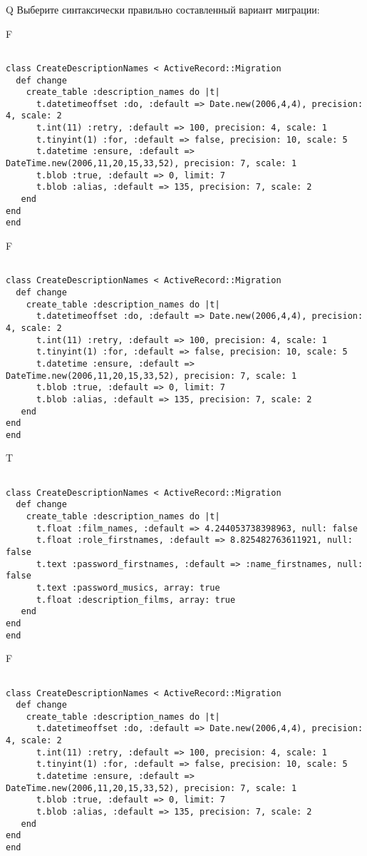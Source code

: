Q
Выберите синтаксически правильно составленный вариант миграции:

F
\begin{verbatim}
		
class CreateDescriptionNames < ActiveRecord::Migration 
  def change 
    create_table :description_names do |t| 
      t.datetimeoffset :do, :default => Date.new(2006,4,4), precision: 4, scale: 2
      t.int(11) :retry, :default => 100, precision: 4, scale: 1
      t.tinyint(1) :for, :default => false, precision: 10, scale: 5
      t.datetime :ensure, :default => DateTime.new(2006,11,20,15,33,52), precision: 7, scale: 1
      t.blob :true, :default => 0, limit: 7
      t.blob :alias, :default => 135, precision: 7, scale: 2
   end
end
end
\end{verbatim}

F
\begin{verbatim}
		
class CreateDescriptionNames < ActiveRecord::Migration 
  def change 
    create_table :description_names do |t| 
      t.datetimeoffset :do, :default => Date.new(2006,4,4), precision: 4, scale: 2
      t.int(11) :retry, :default => 100, precision: 4, scale: 1
      t.tinyint(1) :for, :default => false, precision: 10, scale: 5
      t.datetime :ensure, :default => DateTime.new(2006,11,20,15,33,52), precision: 7, scale: 1
      t.blob :true, :default => 0, limit: 7
      t.blob :alias, :default => 135, precision: 7, scale: 2
   end
end
end
\end{verbatim}

T
\begin{verbatim}
		
class CreateDescriptionNames < ActiveRecord::Migration 
  def change 
    create_table :description_names do |t| 
      t.float :film_names, :default => 4.244053738398963, null: false
      t.float :role_firstnames, :default => 8.825482763611921, null: false
      t.text :password_firstnames, :default => :name_firstnames, null: false
      t.text :password_musics, array: true
      t.float :description_films, array: true
   end
end
end
\end{verbatim}

F
\begin{verbatim}
		
class CreateDescriptionNames < ActiveRecord::Migration 
  def change 
    create_table :description_names do |t| 
      t.datetimeoffset :do, :default => Date.new(2006,4,4), precision: 4, scale: 2
      t.int(11) :retry, :default => 100, precision: 4, scale: 1
      t.tinyint(1) :for, :default => false, precision: 10, scale: 5
      t.datetime :ensure, :default => DateTime.new(2006,11,20,15,33,52), precision: 7, scale: 1
      t.blob :true, :default => 0, limit: 7
      t.blob :alias, :default => 135, precision: 7, scale: 2
   end
end
end
\end{verbatim}

